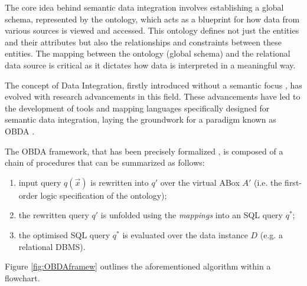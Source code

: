 The core idea behind semantic data integration involves establishing a global schema, represented by the ontology, which acts as a blueprint for how data from various sources is viewed and accessed. This ontology defines not just the entities and their attributes but also the relationships and constraints between these entities. The mapping between the ontology (global schema) and the relational data source is critical as it dictates how data is interpreted in a meaningful way.

The concept of Data Integration, firstly introduced without a semantic focus \cite{DBLP:conf/pods/Lenzerini02}, has evolved with research advancements in this field. These advancements have led to the development of tools and mapping languages specifically designed for semantic data integration, laying the groundwork for a paradigm known as \ac{OBDA} \cite{DBLP:conf/ijcai/XiaoCKLPRZ18}.

The \ac{OBDA} framework, that has been precisely formalized \cite{DBLP:conf/aiia/BotoevaCCCX18}, is composed of a chain of procedures that can be summarized as follows:
\begin{enumerate}
    \item input query ${q(\vec{x})}$ is rewritten \cite{DBLP:conf/otm/MakrisGBC10} into ${q'}$ over the virtual ABox ${A'}$ (i.e. the first-order logic specification of the ontology);
    \item the rewritten query ${q'}$ is unfolded using the \textit{mappings} into an \ac{SQL} query ${q^*}$;
    \item the optimised SQL query ${q^*}$ is evaluated over the data instance ${D}$ (e.g. a relational \ac{DBMS}).
\end{enumerate}

Figure \ref{fig:OBDAframew} outlines the aforementioned algorithm within a flowchart.

